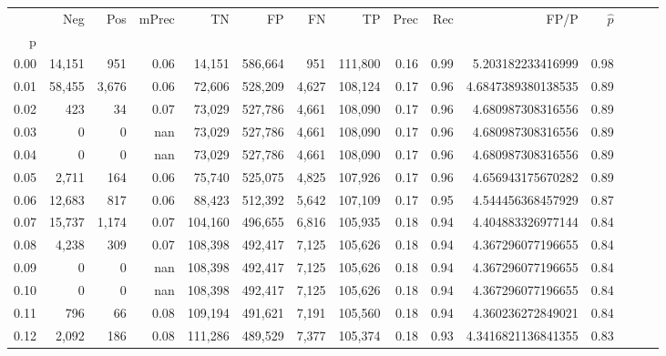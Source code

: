 \begin{tabular}{rrrrrrrrrrrrrrr}
\toprule
{} &     Neg &     Pos & mPrec &       TN &       FP &       FN &       TP &  Prec &   Rec &                  FP/P & $\hat{p}$ \\
p    &         &         &       &          &          &          &          &       &       &                       &           \\
\midrule
0.00 &  14,151 &     951 &  0.06 &   14,151 &  586,664 &      951 &  111,800 &  0.16 &  0.99 &     5.203182233416999 &      0.98 \\
0.01 &  58,455 &   3,676 &  0.06 &   72,606 &  528,209 &    4,627 &  108,124 &  0.17 &  0.96 &    4.6847389380138535 &      0.89 \\
0.02 &     423 &      34 &  0.07 &   73,029 &  527,786 &    4,661 &  108,090 &  0.17 &  0.96 &     4.680987308316556 &      0.89 \\
0.03 &       0 &       0 &   nan &   73,029 &  527,786 &    4,661 &  108,090 &  0.17 &  0.96 &     4.680987308316556 &      0.89 \\
0.04 &       0 &       0 &   nan &   73,029 &  527,786 &    4,661 &  108,090 &  0.17 &  0.96 &     4.680987308316556 &      0.89 \\
0.05 &   2,711 &     164 &  0.06 &   75,740 &  525,075 &    4,825 &  107,926 &  0.17 &  0.96 &     4.656943175670282 &      0.89 \\
0.06 &  12,683 &     817 &  0.06 &   88,423 &  512,392 &    5,642 &  107,109 &  0.17 &  0.95 &     4.544456368457929 &      0.87 \\
0.07 &  15,737 &   1,174 &  0.07 &  104,160 &  496,655 &    6,816 &  105,935 &  0.18 &  0.94 &     4.404883326977144 &      0.84 \\
0.08 &   4,238 &     309 &  0.07 &  108,398 &  492,417 &    7,125 &  105,626 &  0.18 &  0.94 &     4.367296077196655 &      0.84 \\
0.09 &       0 &       0 &   nan &  108,398 &  492,417 &    7,125 &  105,626 &  0.18 &  0.94 &     4.367296077196655 &      0.84 \\
0.10 &       0 &       0 &   nan &  108,398 &  492,417 &    7,125 &  105,626 &  0.18 &  0.94 &     4.367296077196655 &      0.84 \\
0.11 &     796 &      66 &  0.08 &  109,194 &  491,621 &    7,191 &  105,560 &  0.18 &  0.94 &     4.360236272849021 &      0.84 \\
0.12 &   2,092 &     186 &  0.08 &  111,286 &  489,529 &    7,377 &  105,374 &  0.18 &  0.93 &    4.3416821136841355 &      0.83 \\

\end{tabular}
